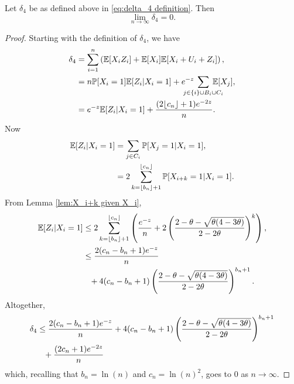 	\begin{lemma}
	\label{lem:delta4 goes to 0}
		Let $\delta_4$ be as defined above in \eqref{eq:delta_4 definition}. Then
		\begin{equation}
			\lim_{n\rightarrow\infty} \delta_4 = 0.
		\end{equation}
	\end{lemma}
	\begin{proof}
		Starting with the definition of $\delta_4$, we have
		\begin{align}
			\delta_4 &= \sum_{i = 1}^n \left(\expect[X_i Z_i] + \expect[X_i]\expect[X_i + U_i + Z_i]\right),\\
				&= n \prob[X_i = 1] \expect[Z_i | X_i = 1] + \euler^{-z} \hspace{-15pt} \sum_{j \in \{i\}\cup B_i \cup C_i} \hspace{-15pt} \expect[X_j],\\
				&= \euler^{-z}\expect[Z_i | X_i = 1] + \frac{(2\lfloor c_n\rfloor+1)\euler^{-2z}}{n}.
		\end{align}
		Now
		\begin{align}
			\mathbb{E}[Z_i | X_i = 1] &= \sum_{j \in C_i} \mathbb{P}[X_j = 1 | X_i = 1],\\
			&= 2 \sum_{k = \lfloor b_n \rfloor + 1}^{\lfloor c_n\rfloor} \mathbb{P}[X_{i+k} = 1 | X_i = 1].
		\end{align}
		From Lemma \ref{lem:X_i+k given X_i},
		\begin{align}
			\mathbb{E}[Z_i | X_i = 1] &\leq 2 \sum_{k = \lfloor b_n\rfloor + 1}^{\lfloor c_n\rfloor} \left(\frac{e^{-z}}{n} + 2\left(\frac{2 - \theta - \sqrt{\theta(4 - 3\theta)}}{2 - 2\theta}\right)^k\right),\\
				&\leq \frac{2(c_n - b_n + 1)e^{-z}}{n} \notag \\
				&\phantom{=} + 4(c_n - b_n + 1)\left(\frac{2 - \theta - \sqrt{\theta(4 - 3\theta)}}{2 - 2\theta}\right)^{b_n + 1}.
		\end{align}
		Altogether,
		\begin{align}
			\delta_4 &\leq \frac{2(c_n - b_n + 1)e^{-z}}{n} + 4(c_n - b_n + 1)\left(\frac{2 - \theta -\sqrt{\theta(4 - 3\theta)}}{2 - 2\theta}\right)^{b_n + 1} \notag \\
			&\phantom{=} + \frac{(2c_n + 1)e^{-2z}}{n}
		\end{align}
		which, recalling that $b_n = \ln(n)$ and $c_n = \ln(n)^2$, goes to $0$ as $n \rightarrow \infty$.
	\end{proof}
	
